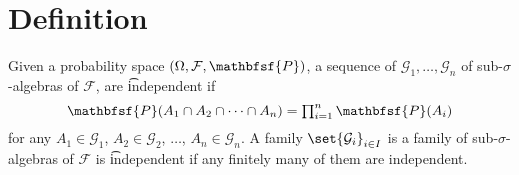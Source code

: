 
\section*{Definition}

Given a probability space $(\Omega , \mathcal{F} , \mathbfsf{P} )$, a sequence of $\mathcal{G} _1, \dots , \mathcal{G} _n$ of sub-$\sigma $-algebras of $\mathcal{F} $, are \t{independent} if
\[
\textstyle
\mathbfsf{P} (A_1 \cap  A_2 \cap  \cdots \cap  A_n) = \prod_{i = 1}^{n} \mathbfsf{P} (A_i)
\]
for any $A_1 \in \mathcal{G} _1$, $A_2 \in \mathcal{G} _2$, $\dots $, $A_n \in \mathcal{G} _n$.
A family $\set{\mathcal{G} _i}_{i \in I}$ is a family of sub-$\sigma $-algebras of $\mathcal{F} $ is \t{independent} if any finitely many of them are independent.

\blankpage